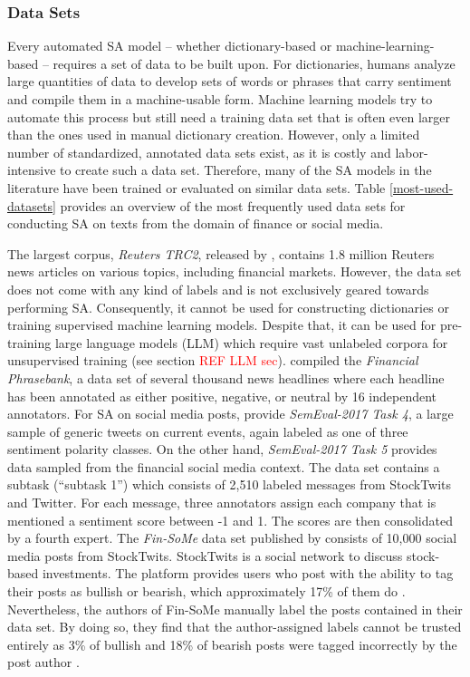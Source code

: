 \subsubsection{Data Sets}

Every automated SA model -- whether dictionary-based or machine-learning-based -- requires a set of data to be built upon. For dictionaries, humans analyze large quantities of data to develop sets of words or phrases that carry sentiment and compile them in a machine-usable form. Machine learning models try to automate this process but still need a training data set that is often even larger than the ones used in manual dictionary creation. However, only a limited number of standardized, annotated data sets exist, as it is costly and labor-intensive to create such a data set. Therefore, many of the SA models in the literature have been trained or evaluated on similar data sets. Table \ref{most-used-datasets} provides an overview of the most frequently used data sets for conducting SA on texts from the domain of finance or social media.



The largest corpus, \emph{Reuters TRC2}, released by , contains 1.8 million Reuters news articles on various topics, including financial markets. However, the data set does not come with any kind of labels and is not exclusively geared towards performing SA. Consequently, it cannot be used for constructing dictionaries or training supervised machine learning models. Despite that, it can be used for pre-training large language models (LLM) which require vast unlabeled corpora for unsupervised training (see section \textcolor{red}{REF LLM sec}).  compiled the \emph{Financial Phrasebank}, a data set of several thousand news headlines where each headline has been annotated as either positive, negative, or neutral by 16 independent annotators. For SA on social media posts,  provide \emph{SemEval-2017 Task 4}, a large sample of generic tweets on current events, again labeled as one of three sentiment polarity classes. On the other hand, \emph{SemEval-2017 Task 5}  provides data sampled from the financial social media context. The data set contains a subtask (``subtask 1'') which consists of 2,510 labeled messages from StockTwits and Twitter. For each message, three annotators assign each company that is mentioned a sentiment score between -1 and 1. The scores are then consolidated by a fourth expert. The \emph{Fin-SoMe} data set published by  consists of 10,000 social media posts from StockTwits. StockTwits is a social network to discuss stock-based investments. The platform provides users who post with the ability to tag their posts as bullish or bearish, which approximately 17\% of them do . Nevertheless, the authors of Fin-SoMe manually label the posts contained in their data set. By doing so, they find that the author-assigned labels cannot be trusted entirely as 3\% of bullish and 18\% of bearish posts were tagged incorrectly by the post author .

